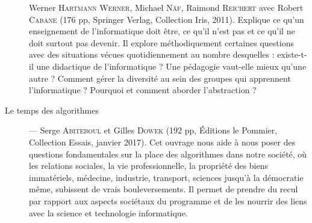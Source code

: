 \begin{description}
Werner \textsc{Hartmann Werner}, Michael \textsc{Näf}, \linebreak Raimond \textsc{Reichert} avec Robert \textsc{Cabane} (176 pp, Springer Verlag, Collection Iris, 2011). Explique ce qu’un enseignement de l’informatique doit être, ce qu’il n’est pas et ce qu’il ne doit surtout pas devenir. Il explore méthodiquement certaines questions avec des situations vécues quotidiennement au nombre desquelles : existe-t-il une didactique de l’informatique ? Une pédagogie vaut-elle mieux qu’une autre ? Comment gérer la diversité au sein des groupes qui apprennent l’informatique ? Pourquoi et comment aborder l’abstraction ?
\item[Le temps des algorithmes] --- 
Serge \textsc{Abiteboul} et Gilles \textsc{Dowek} (192 pp,  Éditions le Pommier, Collection Essais, janvier 2017). Cet ouvrage nous aide à nous poser des questions fondamentales sur la place des algorithmes dans notre société, où les relations sociales, la vie professionnelle, la propriété des biens immatériels, médecine, industrie, transport, sciences jusqu’à la démocratie même, subissent de vrais bouleversements. Il permet de prendre du recul par rapport aux aspects sociétaux du programme et de les nourrir des liens avec la science et technologie informatique.

\end{description}
